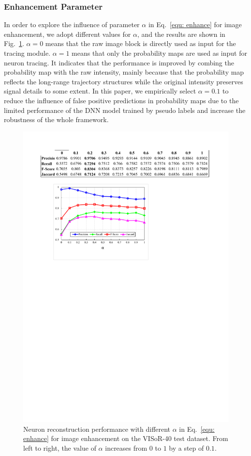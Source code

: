 \subsubsection{Enhancement Parameter} 

In order to explore the influence of parameter $\alpha$ in Eq.~\eqref{equ: enhance} for image enhancement, we adopt different values for $\alpha$, and the results are shown in Fig.~\ref{fig:weight_paprameter}.
$\alpha=0$ means that the raw image block is directly used as input for the tracing module.
$\alpha=1$ means that only the probability maps are used as input for neuron tracing. 
It indicates that the performance is improved by combing the probability map with the raw intensity, mainly because that the probability map reflects the long-range trajectory structures while the original intensity preserves signal details to some extent.
In this paper, we empirically select $\alpha=0.1$ to reduce the influence of false positive predictions in probability maps due to the limited performance of the DNN model trained by pseudo labels and increase the robustness of the whole framework.

\begin{figure}[t]
	\centering
	\includegraphics[width=0.8\columnwidth]{./Illustrations/weight_paprameter7.pdf}
	\caption{Neuron reconstruction performance with different $\alpha$ in Eq.~\eqref{equ: enhance} for image enhancement on the VISoR-40 test dataset. From left to right, the value of $\alpha$ increases from $0$ to $1$ by a step of $0.1$.  }
	\label{fig:weight_paprameter}
\end{figure}


